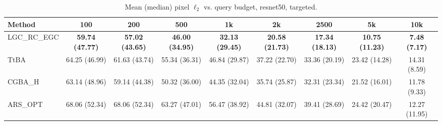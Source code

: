 \begin{table}[t]
\centering\footnotesize
\caption{Mean (median) pixel $\ell_2$ vs. query budget, resnet50, targeted.}
\begin{tabular}{lcccccccc}
\toprule
Method & 100 & 200 & 500 & 1k & 2k & 2500 & 5k & 10k \\
\midrule
LGC\_RC\_EGC & \textbf{59.74 (47.77)} & \textbf{57.02 (43.65)} & \textbf{46.00 (34.95)} & \textbf{32.13 (29.45)} & \textbf{20.58 (21.73)} & \textbf{17.34 (18.13)} & \textbf{10.75 (11.23)} & \textbf{7.48 (7.17)} \\
TtBA & 64.25 (46.99) & 61.63 (43.74) & 55.34 (36.31) & 46.84 (29.87) & 37.22 (22.70) & 33.36 (20.19) & 23.42 (14.28) & 14.31 (8.59) \\
CGBA\_H & 63.14 (48.96) & 59.14 (44.38) & 50.32 (36.00) & 44.35 (32.04) & 35.74 (25.87) & 32.31 (23.34) & 21.52 (16.01) & 11.78 (9.33) \\
ARS\_OPT & 68.06 (52.34) & 68.06 (52.34) & 63.27 (47.01) & 56.47 (38.92) & 44.81 (32.07) & 39.41 (28.69) & 24.42 (20.47) & 12.27 (11.95) \\
\bottomrule
\end{tabular}
\end{table}
